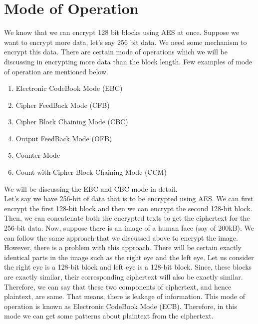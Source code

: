 \documentclass[11pt]{article}
\begin{document}
\section{Mode of Operation}
We know that we can encrypt 128 bit blocks using AES at once. Suppose we want to encrypt more data, let's say 256 bit data. We need some mechanism to encrypt this data. There are certain mode of operations which we will be discussing in encrypting more data than the block length. Few examples of mode of operation are mentioned below.
\begin{enumerate}
    \item Electronic CodeBook Mode (EBC)
    \item Cipher FeedBack Mode (CFB)
    \item Cipher Block Chaining Mode (CBC)
    \item Output FeedBack Mode (OFB)
    \item Counter Mode
    \item Count with Cipher Block Chaining Mode (CCM)
\end{enumerate}
We will be discussing the EBC and CBC mode in detail.\\

Let's say we have 256-bit of data that is to be encrypted using AES. We can first encrypt the first 128-bit block and then we can encrypt the second 128-bit block. Then, we can concatenate both the encrypted texts to get the ciphertext for the 256-bit data. Now, suppose there is an image of a human face (say of 200kB). We can follow the same approach that we discussed above to encrypt the image. However, there is a problem with this approach. There will be certain exactly identical parts in the image such as the right eye and the left eye. Let us consider the right eye is a 128-bit block and left eye is a 128-bit block. Since, these blocks are exactly similar, their corresponding ciphertext will also be exactly similar. Therefore, we can say that these two components of ciphertext, and hence plaintext, are same. That means, there is leakage of information. This mode of operation is known as Electronic CodeBook Mode (ECB). Therefore, in this mode we can get some patterns about plaintext from the ciphertext.
\end{document}
